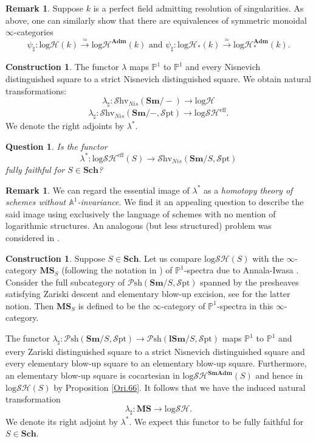 \documentclass[11pt, a4paper]{amsart}
\newtheorem{ques}[thm]{Question}
\theoremstyle{definition}
\newtheorem{const}[thm]{Construction}
\newtheorem{rmk}[thm]{Remark}
\numberwithin{equation}{subsection}
\renewcommand{\P}{\mathbb{P}}
\newcommand{\A}{\mathbb{A}}
\newcommand{\Sch}{\mathbf{Sch}}
\newcommand{\Sm}{\mathbf{Sm}}
\newcommand{\lSm}{\mathbf{lSm}}
\newcommand{\Adm}{\mathbf{Adm}}
\newcommand{\SmAdm}{\mathbf{SmAdm}}
\newcommand{\sharpp}{\sharp}
\newcommand{\infPsh}{\mathcal{P}\mathrm{sh}}
\newcommand{\infShv}{\mathcal{S}\mathrm{hv}}
\newcommand{\infSpt}{\mathcal{S}\mathrm{pt}}
\newcommand{\inflogH}{\mathrm{log}\mathcal{H}}
\newcommand{\inflogHpt}{\mathrm{log}\mathcal{H}_\ast}
\newcommand{\inflogSH}{\mathrm{log}\mathcal{SH}}
\newcommand{\inflogSHS}{\mathrm{log}\mathcal{SH}^{\mathrm{eff}}}
\newcommand{\MS}{\mathbf{MS}}
\begin{document}
\begin{rmk}
\label{compth.15}
Suppose $k$ is a perfect field admitting resolution of singularities.
As above,
one can similarly show that there are equivalences of symmetric monoidal $\infty$-categories
\[
\psi_\sharp
\colon
\inflogH(k)
\xrightarrow{\simeq}
\inflogH^\Adm(k)
\text{ and }
\psi_\sharp
\colon
\inflogHpt(k)
\xrightarrow{\simeq}
\inflogHpt^\Adm(k).
\]
\end{rmk}

\begin{const}
\label{compth.9} The functor $\lambda$ maps $\P^1$ to $\P^1$ and every Nisnevich distinguished square to a strict 
Nisnevich distinguished square. We obtain
natural transformations:
\[
\lambda_\sharpp\colon \infShv_{Nis}(\Sm/-)\to \inflogH
\]
\[
\lambda_\sharpp\colon \infShv_{Nis}(\Sm/-,\infSpt)\to \inflogSHS.
\]
We denote the right adjoints by $\lambda^*$.
\end{const}

\begin{ques}
\label{compth.10}
Is the functor
\[
\lambda^*\colon \inflogSHS(S) \to \infShv_{Nis}(\Sm/S,\infSpt)
\]
fully faithful for $S\in \Sch$?
\end{ques}

\begin{rmk}\label{rmk:non_A1_stable}
We can regard the essential image of $\lambda^*$ as a \emph{homotopy theory of schemes without $\A^1$-invariance}. 
We find it an appealing question to describe the said image using exclusively the language of schemes with no mention of logarithmic structures. An analogous (but less structured) problem was considered in \cite[3.3.5]{BThesisPubl}.
\end{rmk}

 
\begin{const}
\label{compth.16}
Suppose $S\in \Sch$.
Let us compare $\inflogSH(S)$ with the $\infty$-category $\MS_S$ (following the notation in \cite[\S 4]{AHI}) of $\P^1$-spectra due to Annala-Iwasa \cite{AI}.
Consider the full subcategory of $\infPsh(\Sm/S,\infSpt)$ spanned by the presheaves satisfying Zariski descent and elementary blow-up excision,
see \cite[Definition 2.1(i)]{AHI} for the latter notion.
Then $\MS_S$ is defined to be the $\infty$-category of $\P^1$-spectra in this $\infty$-category.

The functor $\lambda_\sharp\colon \infPsh(\Sm/S,\infSpt)\to \infPsh(\lSm/S,\infSpt)$ maps $\P^1$ to $\P^1$ and every Zariski distinguished square to a strict Nisnevich distinguished square and every elementary blow-up square to an elementary blow-up square.
Furthermore, an elementary blow-up square is cocartesian in $\inflogSH^{\SmAdm}(S)$ and hence in $\inflogSH(S)$ by Proposition \ref{Ori.66}.
It follows that we have the induced natural transformation
\[
\lambda_\sharp\colon\MS\to \inflogSH.
\]
We denote its right adjoint by $\lambda^*$. We expect this functor to be fully faithful for $S\in \Sch$. 
\end{const}
\end{document}
